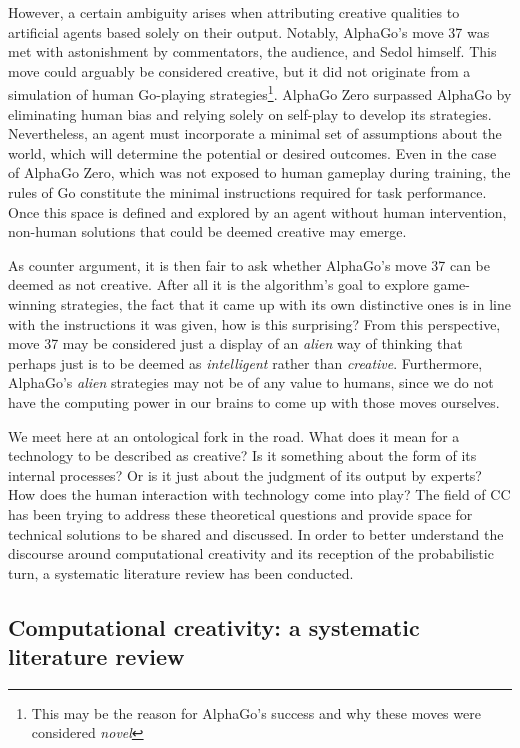However, a certain ambiguity arises when attributing creative qualities to artificial agents based solely on their output. Notably, AlphaGo's \citep{Silver2016} move 37 was met with astonishment by commentators, the audience, and Sedol himself. This move could arguably be considered creative, but it did not originate from a simulation of human Go-playing strategies\footnote{This may be the reason for AlphaGo's success and why these moves were considered \emph{novel}}. AlphaGo Zero \citep{Silver2017} surpassed AlphaGo by eliminating human bias and relying solely on self-play to develop its strategies. Nevertheless, an agent must incorporate a minimal set of assumptions about the world, which will determine the potential or desired outcomes. Even in the case of AlphaGo Zero, which was not exposed to human gameplay during training, the rules of Go constitute the minimal instructions required for task performance. Once this space is defined and explored by an agent without human intervention, non-human solutions that could be deemed creative may emerge.

As counter argument, it is then fair to ask whether AlphaGo's move 37 can be deemed as not creative. After all it is the algorithm's goal to explore game-winning strategies, the fact that it came up with its own distinctive ones is in line with the instructions it was given, how is this surprising? From this perspective, move 37 may be considered just a display of an \emph{alien} way of thinking \citep{Fazi2018} that perhaps just is to be deemed as \emph{intelligent} rather than \emph{creative}. Furthermore, AlphaGo's \emph{alien} strategies may not be of any value to humans, since we do not have the computing power in our brains to come up with those moves ourselves. 

We meet here at an ontological fork in the road. What does it mean for a technology to be described as creative? Is it something about the form of its internal processes? Or is it just about the judgment of its output by experts? How does the human interaction with technology come into play? The field of CC has been trying to address these theoretical questions and provide space for technical solutions to be shared and discussed. In order to better understand the discourse around computational creativity and its reception of the probabilistic turn, a systematic literature review has been conducted.  

\subsection{Computational creativity: a systematic literature review}

